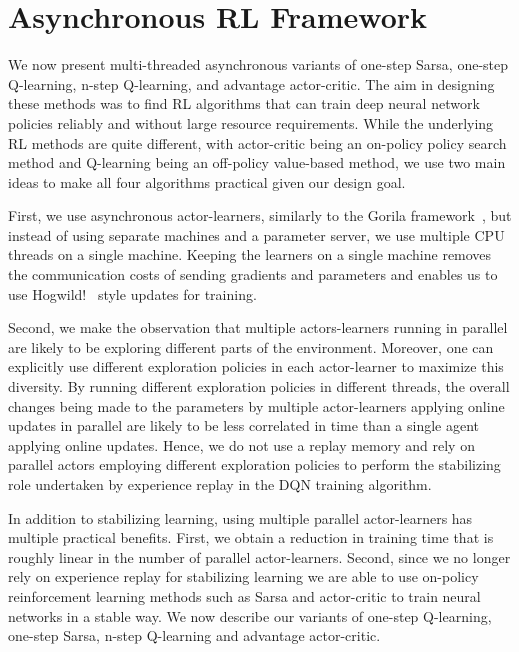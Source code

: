 \documentclass{article} \usepackage{times}
\begin{document}
 \vspace{-0.1cm}
\section{Asynchronous RL Framework}
\label{sec:method}



We now present multi-threaded asynchronous variants of one-step Sarsa, one-step Q-learning, n-step Q-learning, and advantage actor-critic.
The aim in designing these methods was to find RL algorithms that can train deep neural network policies reliably and without large resource requirements.
While the underlying RL methods are quite different, with actor-critic being an on-policy policy search method and Q-learning being an off-policy value-based method, we use two main ideas to make all four algorithms practical given our design goal.

First, we use asynchronous actor-learners, similarly to the Gorila framework~\citep{nair2015gorila}, but instead of using separate machines and a parameter server, we use multiple CPU threads on a single machine.
Keeping the learners on a single machine removes the communication costs of sending gradients and parameters and enables us to use Hogwild!~\citep{recht2011hogwild} style updates for training.

Second, we make the observation that multiple actors-learners running in parallel are likely to be exploring different parts of the environment.
Moreover, one can explicitly use different exploration policies in each actor-learner to maximize this diversity.
By running different exploration policies in different threads, the overall changes being made to the parameters by multiple actor-learners applying online updates in parallel are likely to be less correlated in time than a single agent applying online updates.
Hence, we do not use a replay memory and rely on parallel actors employing different exploration policies to perform the stabilizing role undertaken by experience replay in the DQN training algorithm.

In addition to stabilizing learning, using multiple parallel actor-learners has multiple practical benefits.
First, we obtain a reduction in training time that is roughly linear in the number of parallel actor-learners.
Second, since we no longer rely on experience replay for stabilizing learning we are able to use on-policy reinforcement learning methods such as Sarsa and actor-critic to train neural networks in a stable way.
We now describe our variants of one-step Q-learning, one-step Sarsa, n-step Q-learning and advantage actor-critic.
\end{document}
